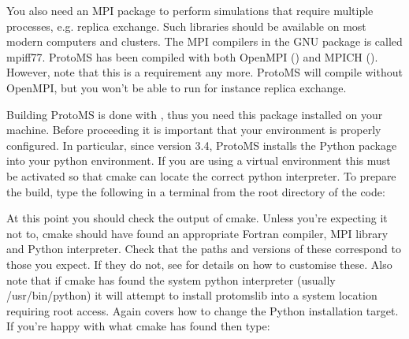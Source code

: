 \documentclass[letterpaper,10pt,english]{sphinxmanual}
\begin{document}
You also need an MPI package to perform simulations that require multiple processes, e.g. replica exchange. Such libraries should be available on most modern computers and clusters. The MPI compilers in the GNU package is called mpiff77. ProtoMS has been compiled with both OpenMPI () and MPICH (). However, note that this is  a requirement any more. ProtoMS will compile without OpenMPI, but you won’t be able to run for instance replica exchange.

Building ProtoMS is done with  , thus you need this package installed on your machine. Before proceeding it is important that your environment is properly configured. In particular, since version 3.4, ProtoMS installs the Python package  into your python environment. If you are using a virtual environment this must be activated so that cmake can locate the correct python interpreter. To prepare the build, type the following in a terminal from the root directory of the code:

%
\begin{sphinxVerbatim}[commandchars=\\\{\}]
 

 

 
\end{sphinxVerbatim}

At this point you should check the output of cmake. Unless you’re expecting it not to, cmake should have found an appropriate Fortran compiler,  MPI library and Python interpreter. Check that the paths and versions of these correspond to those you expect. If they do not, see {\hyperref[\detokenize{compilation:custom-build}]{}} for details on how to customise these. Also note that if cmake has found the system python interpreter (usually /usr/bin/python) it will attempt to install protomslib into a system location requiring root access. Again {\hyperref[\detokenize{compilation:custom-build}]{}} covers how to change the Python installation target. If you’re happy with what cmake has found then type:

%
\begin{sphinxVerbatim}[commandchars=\\\{\}]
 
\end{sphinxVerbatim}
\end{document}
